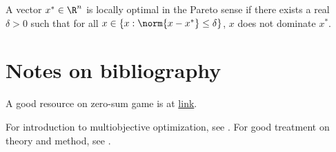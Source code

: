 \begin{refsection}
\begin{definition}\cite[19]{collette2013multiobjective}
A vector $x^*\in \R^n$ is locally optimal in the Pareto sense if there exists a real $\delta > 0$ such that for all $x \in \{x:\norm{x-x^*}\leq \delta\}$, $x$ does not dominate $x^*$.
\end{definition}


\section{Notes on bibliography}

A good resource on zero-sum game is at \href{http://math.ucr.edu/home/baez/games/}{link}.

\cite{gibbons1992game}\cite{fudenberg1991game}
For introduction to multiobjective optimization, see \cite{collette2013multiobjective}.
For good treatment on theory and method, see \cite{miettinen2012nonlinear}.
\printbibliography
\end{refsection}